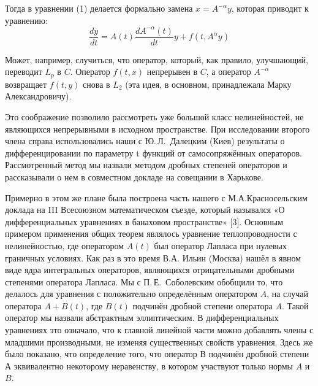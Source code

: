 Тогда в уравнении (1) делается формально замена \linebreak $x = A^{-\alpha} y$, которая приводит к уравнению:
\begin{equation}
\frac{dy}{dt} = A(t)\frac{d A^{-\alpha} (t)}{dt} y + f(t, A^{\alpha} y)
\end{equation}

Может, например, случиться, что оператор, который, как правило, улучшающий, переводит $L_p$ в $C$. Оператор $f(t,x)$ непрерывен в $C$, а оператор $A^{-\alpha}$  возвращает $f(t, y)$ снова в $L_2$ (эта идея, в основном, принадлежала Марку Александровичу).

Это соображение позволило рассмотреть уже большой класс нелинейностей,
не являющихся непрерывными в исходном пространстве.
При исследовании второго члена
\linebreak
справа использовались наши с Ю.\,Л.~Далецким (Киев) результаты о дифференцировании по параметру t функций от самосопряжённых операторов. Рассмотренный метод мы назвали методом дробных степеней операторов и рассказывали о нем в совместном докладе на совещании в Харькове.

Примерно в этом же плане была построена часть нашего с М.А.Красносельским доклада на III Всесоюзном математическом съезде, который назывался «О дифференциальных уравнениях в банаховом пространстве» [3]. Основным примером применения общих теорем являлось уравнение теплопроводности с нелинейностью, где оператором $A(t)$ был оператор Лапласа при нулевых граничных условиях. Как раз в это время В.А. Ильин (Москва) нашёл в явном виде ядра интегральных операторов, являющихся отрицательными дробными степенями оператора Лапласа.
Мы с П.\,Е.~Соболевским обобщили то, что делалось для уравнения с положительно определённым оператором $A$, на случай оператора $A+B(t)$, где $B(t)$ подчинён дробной степени оператора $A$. Такой оператор мы назвали абстрактным эллиптическим. В дифференциальных уравнениях это означало, что к главной линейной части можно добавлять члены с младшими производными, не изменяя существенных свойств уравнения. Здесь же было показано, что определение того, что оператор $В$ подчинён дробной степени $А$ эквивалентно некоторому неравенству, в котором участвуют только нормы $A$ и $B$.


